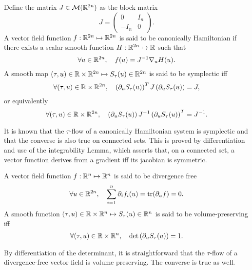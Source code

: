\begin{definition}
  Define the matrix $J \in {\cal M}(\mathbb{R}^{2n})$ as the block matrix
  $$
  J = \left(
  \begin{array}{cc}
    0 & I_n \\
    -I_n & 0
  \end{array}
  \right).
  $$
  A vector field function $f:\mathbb{R}^{2n} \mapsto \mathbb{R}^{2n}$ is said to be
  canonically  Hamiltonian if there exists a scalar smooth function
  $H:\mathbb{R}^{2n} \mapsto \mathbb{R}$ such that 
  \begin{align*}
    \forall u \in \mathbb{R}^{2n}, \quad f(u) = J^{-1} \nabla_u H(u).
  \end{align*}
  A smooth map $(\tau,u) \in \mathbb{R} \times \mathbb{R}^{2n} \mapsto  S_\tau(u) \in
  \mathbb{R}^{2n}$ is said to be symplectic iff
  \begin{align} \label{def:symplectif} %
    \forall (\tau, u) \in \R \times \R^{2n}, \quad 
    \left(\partial_u S_\tau(u)\right)^T J \left(\partial_u S_\tau(u)\right) = J,
  \end{align}
  or equivalently
  \begin{align} %
    \forall (\tau, u) \in \R \times \R^{2n}, \quad 
    \left(\partial_u S_\tau(u)\right) J^{-1} \left(\partial_u S_\tau(u)\right)^T = J^{-1} .
  \end{align}
\end{definition}
\begin{remark}
  It is known that the $\tau$-flow of a canonically Hamiltonian system
  is symplectic and that the converse is also true on connected sets.
  This is proved by differentiation and use of the integrability Lemma,
  which asserts that, on a connected set, a vector function derives from
  a gradient iff its jacobian is symmetric.
\end{remark}
\begin{definition}
  A vector field function $f:\mathbb{R}^{n} \mapsto \mathbb{R}^{n}$ is said to be
  divergence free 
  \begin{align*}
    \forall u \in \mathbb{R}^{2n}, \quad \sum_{i=1}^n \partial_i f_i(u) = \operatorname{tr}(\partial_u f)=0.
  \end{align*}
  A smooth function $(\tau,u) \in \mathbb{R} \times \mathbb{R}^{n} \mapsto  S_\tau(u) \in
  \mathbb{R}^{n}$ is said to be volume-preserving iff
  \begin{align*}
    \forall (\tau, u) \in \mathbb{R} \times \mathbb{R}^n, 
    \quad \det\left (\partial_u S_\tau(u)\right)=1.
  \end{align*}
\end{definition}
\begin{remark}
  By differentiation of the determinant, it is straightforward that the
  $\tau$-flow of a divergence-free vector field is volume preserving. The
  converse is true as well. 
\end{remark}
